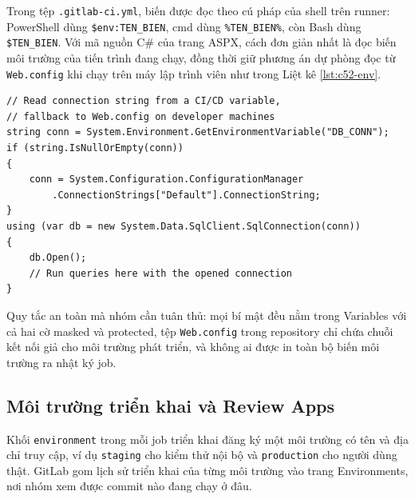 Trong tệp \verb|.gitlab-ci.yml|, biến được đọc theo cú pháp của shell trên runner: PowerShell dùng
\verb|$env:TEN_BIEN|, cmd dùng \verb|%TEN_BIEN%|, còn Bash dùng \verb|$TEN_BIEN|. Với mã nguồn C\# của
trang ASPX, cách đơn giản nhất là đọc biến môi trường của tiến trình đang chạy, đồng thời giữ phương
án dự phòng đọc từ \verb|Web.config| khi chạy trên máy lập trình viên như trong Liệt kê \ref{lst:c52-env}.
\begin{lstlisting}[language={[Sharp]C},caption={Đọc biến môi trường từ mã nguồn trang ASPX},label={lst:c52-env}]
// Read connection string from a CI/CD variable,
// fallback to Web.config on developer machines
string conn = System.Environment.GetEnvironmentVariable("DB_CONN");
if (string.IsNullOrEmpty(conn))
{
    conn = System.Configuration.ConfigurationManager
        .ConnectionStrings["Default"].ConnectionString;
}
using (var db = new System.Data.SqlClient.SqlConnection(conn))
{
    db.Open();
    // Run queries here with the opened connection
}
\end{lstlisting}

Quy tắc an toàn mà nhóm cần tuân thủ: mọi bí mật đều nằm trong Variables với cả hai cờ masked và
protected, tệp \verb|Web.config| trong repository chỉ chứa chuỗi kết nối giả cho môi trường phát triển,
và không ai được in toàn bộ biến môi trường ra nhật ký job.

\subsection{Môi trường triển khai và Review Apps}

Khối \verb|environment| trong mỗi job triển khai đăng ký một môi trường có tên và địa chỉ truy cập,
ví dụ \verb|staging| cho kiểm thử nội bộ và \verb|production| cho người dùng thật. GitLab gom lịch sử
triển khai của từng môi trường vào trang Environments, nơi nhóm xem được commit nào đang chạy ở đâu.

